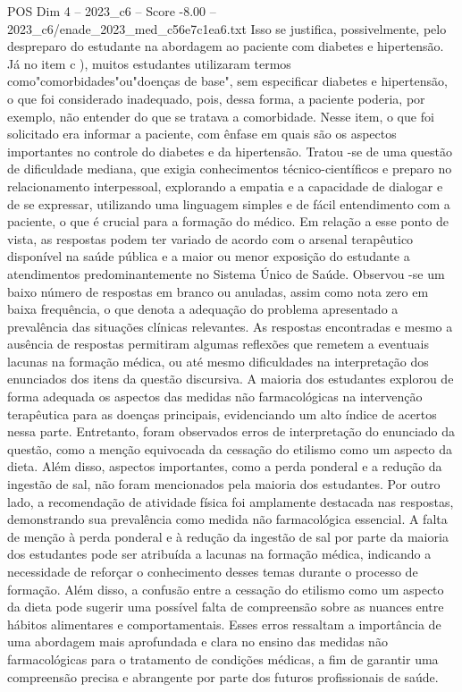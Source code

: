 \begin{textsample}{POS Dim 4 – 2023\_c6 – Score -8.00 – 2023\_c6/enade\_2023\_med\_c56e7c1ea6.txt}
Isso se justifica, possivelmente, pelo despreparo do estudante na abordagem ao paciente com diabetes e hipertensão.
Já no item c ), muitos estudantes utilizaram termos como"comorbidades"ou"doenças de base", sem especificar diabetes e hipertensão, o que foi considerado inadequado, pois, dessa forma, a paciente poderia, por exemplo, não entender do que se tratava a comorbidade.
Nesse item, o que foi solicitado era informar a paciente, com ênfase em quais são os aspectos importantes no controle do diabetes e da hipertensão.
Tratou -se de uma questão de dificuldade mediana, que exigia conhecimentos técnico-científicos e preparo no relacionamento interpessoal, explorando a empatia e a capacidade de dialogar e de se expressar, utilizando uma linguagem simples e de fácil entendimento com a paciente, o que é crucial para a formação do médico.
Em relação a esse ponto de vista, as respostas podem ter variado de acordo com o arsenal terapêutico disponível na saúde pública e a maior ou menor exposição do estudante a atendimentos predominantemente no Sistema Único de Saúde.
Observou -se um baixo número de respostas em branco ou anuladas, assim como nota zero em baixa frequência, o que denota a adequação do problema apresentado a prevalência das situações clínicas relevantes.
As respostas encontradas e mesmo a ausência de respostas permitiram algumas reflexões que remetem a eventuais lacunas na formação médica, ou até mesmo dificuldades na interpretação dos enunciados dos itens da questão discursiva.
A maioria dos estudantes explorou de forma adequada os aspectos das medidas não farmacológicas na intervenção terapêutica para as doenças principais, evidenciando um alto índice de acertos nessa parte.
Entretanto, foram observados erros de interpretação do enunciado da questão, como a menção equivocada da cessação do etilismo como um aspecto da dieta.
Além disso, aspectos importantes, como a perda ponderal e a redução da ingestão de sal, não foram mencionados pela maioria dos estudantes.
Por outro lado, a recomendação de atividade física foi amplamente destacada nas respostas, demonstrando sua prevalência como medida não farmacológica essencial.
A falta de menção à perda ponderal e à redução da ingestão de sal por parte da maioria dos estudantes pode ser atribuída a lacunas na formação médica, indicando a necessidade de reforçar o conhecimento desses temas durante o processo de formação.
Além disso, a confusão entre a cessação do etilismo como um aspecto da dieta pode sugerir uma possível falta de compreensão sobre as nuances entre hábitos alimentares e comportamentais.
Esses erros ressaltam a importância de uma abordagem mais aprofundada e clara no ensino das medidas não farmacológicas para o tratamento de condições médicas, a fim de garantir uma compreensão precisa e abrangente por parte dos futuros profissionais de saúde.

\end{textsample}
